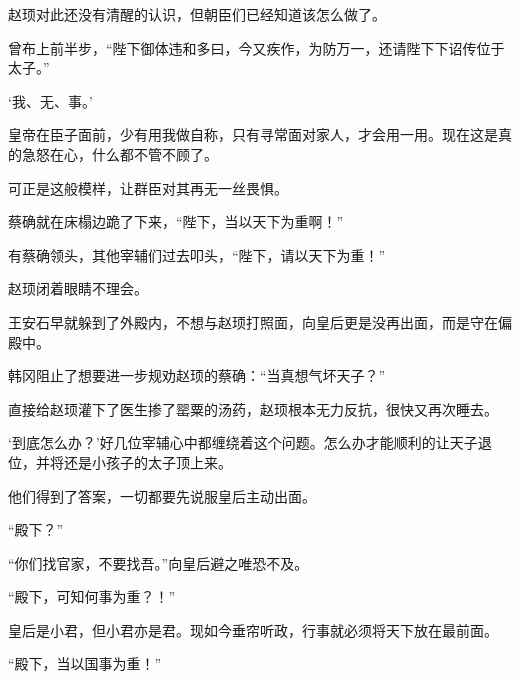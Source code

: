 赵顼对此还没有清醒的认识，但朝臣们已经知道该怎么做了。

曾布上前半步，“陛下御体违和多曰，今又疾作，为防万一，还请陛下下诏传位于太子。”

‘我、无、事。’

皇帝在臣子面前，少有用我做自称，只有寻常面对家人，才会用一用。现在这是真的急怒在心，什么都不管不顾了。

可正是这般模样，让群臣对其再无一丝畏惧。

蔡确就在床榻边跪了下来，“陛下，当以天下为重啊！”

有蔡确领头，其他宰辅们过去叩头，“陛下，请以天下为重！”

赵顼闭着眼睛不理会。

王安石早就躲到了外殿内，不想与赵顼打照面，向皇后更是没再出面，而是守在偏殿中。

韩冈阻止了想要进一步规劝赵顼的蔡确：“当真想气坏天子？”

直接给赵顼灌下了医生掺了罂粟的汤药，赵顼根本无力反抗，很快又再次睡去。

‘到底怎么办？’好几位宰辅心中都缠绕着这个问题。怎么办才能顺利的让天子退位，并将还是小孩子的太子顶上来。

他们得到了答案，一切都要先说服皇后主动出面。

“殿下？”

“你们找官家，不要找吾。”向皇后避之唯恐不及。

“殿下，可知何事为重？！”

皇后是小君，但小君亦是君。现如今垂帘听政，行事就必须将天下放在最前面。

“殿下，当以国事为重！”

